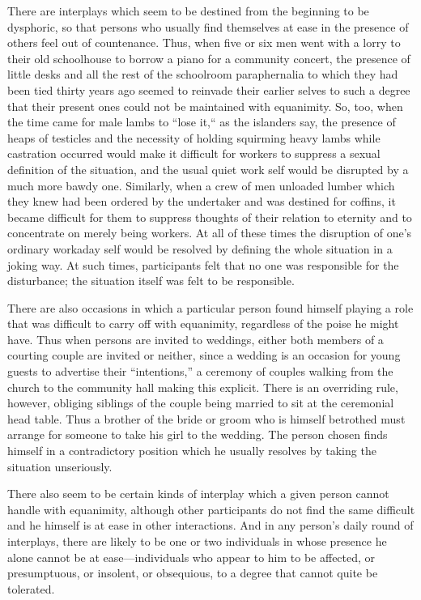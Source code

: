 \documentclass[openany,nobib]{tufte-book}
\begin{document}
There are interplays which seem to be destined from the beginning to be
dysphoric, so that persons who usually find themselves at ease in the
presence of others feel out of countenance. Thus, when five or six men
went with a lorry to their old schoolhouse to borrow a piano for a
community concert, the presence of little desks and all the rest of the
schoolroom paraphernalia to which they had been tied thirty years ago
seemed to reinvade their earlier selves to such a degree that their
present ones could not be maintained with equanimity. So, too, when the
time came for male lambs to ``lose it,`` as the islanders say, the
presence of heaps of testicles and the necessity of holding squirming
heavy lambs while castration occurred would make it difficult for
workers to suppress a sexual definition of the situation, and the usual
quiet work self would be disrupted by a much more bawdy one. Similarly,
when a crew of men unloaded lumber which they knew had been ordered by
the undertaker and was destined for coffins, it became difficult for
them to suppress thoughts of their relation to eternity and to
concentrate on merely being workers. At all of these times the
disruption of one's ordinary workaday self would be resolved by defining
the whole situation in a joking way. At such times, participants felt
that no one was responsible for the disturbance; the situation itself
was felt to be responsible.

There are also occasions in which a particular person found himself
playing a role that was difficult to carry off with equanimity,
regardless of the poise he might have. Thus when persons are invited to
weddings, either both members of a courting couple are invited or
neither, since a wedding is an occasion for young guests to advertise
their ``intentions,'' a ceremony of couples walking from the church to
the community hall making this explicit. There is an overriding rule,
however, obliging siblings of the couple being married to sit at the
ceremonial head table. Thus a brother of the bride or groom who is
himself betrothed must arrange for someone to take his girl to the
wedding. The person chosen finds himself in a contradictory position
which he usually resolves by taking the situation unseriously.

There also seem to be certain kinds of interplay which a given person
cannot handle with equanimity, although other participants do not find
the same difficult and he himself is at ease in other interactions. And
in any person's daily round of interplays, there are likely to be one or
two individuals in whose presence he alone cannot be at
ease---individuals who appear to him to be affected, or presumptuous, or
insolent, or obsequious, to a degree that cannot quite be tolerated.
\end{document}
